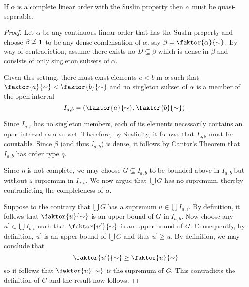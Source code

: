 \begin{prp}
	If $\alpha$ is a complete linear order with the Suslin property then
	$\alpha$ must be quasi-separable.
\end{prp}
\begin{proof}
	Let $\alpha$ be any continuous linear order that has the Suslin property and
	choose $\beta\not\cong\mathbf{1}$ to be any dense condensation of $\alpha$, say
	$\beta=\faktor{\alpha}{\sim}$.  By way of contradiction, assume there exists no
	$D\subseteq\beta$ which is dense in $\beta$ and consists of only singleton
	subsets of $\alpha$.

	Given this setting, there must exist elements $a<b$ in $\alpha$ such that
	$\faktor{a}{\sim}<\faktor{b}{\sim}$ and no singleton subset of $\alpha$ is a
	member of the open interval
	\begin{equation}
		I_{a,b}=\left(\faktor{a}{\sim},\faktor{b}{\sim}\right).
	\end{equation}

	Since $I_{a,b}$ has no singleton members, each of its elements necessarily
	contains an open interval as a subset.  Therefore, by Suslinity, it follows
	that $I_{a,b}$ must be countable.  Since $\beta$ (and thus $I_{a,b}$) is dense,
	it follows by Cantor's Theorem that $I_{a,b}$ has order type $\eta$.

	Since $\eta$ is not complete, we may choose $G\subseteq I_{a,b}$ to be
	bounded above in $I_{{a,b}}$ but without a supremum in $I_{a,b}$.  We
	now argue that $\bigcup G$ has no supremum, thereby contradicting the
	completeness of $\alpha$.

	Suppose to the contrary that $\bigcup G$ has a supremum
	$u\in \bigcup I_{a,b}$.  By definition, it follows that $\faktor{u}{\sim}$ is an
	upper bound of $G$ in $I_{a,b}$.  Now choose any $u^{\prime}\in\bigcup I_{a,b}$
	such that $\faktor{u^{\prime}}{\sim}$ is an upper bound of $G$.  Consequently,
	by definition, $u^{\prime}$ is an upper bound of $\bigcup G$ and thus
	$u^{\prime}\geq u$.  By definition, we may conclude that
	\begin{equation}
		\faktor{u^{\prime}}{\sim}\geq\faktor{u}{\sim}
	\end{equation}
	so it follows that $\faktor{u}{\sim}$ is the supremum of $G$.  This
	contradicts the definition of $G$ and the result now follows.
\end{proof}

